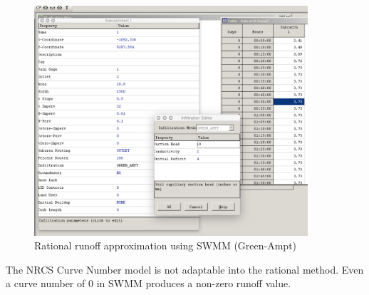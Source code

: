 \documentclass[12pt]{article}
\begin{document}
\begin{figure}[h!] %
   \centering
   \includegraphics[width=4in]{SWMMRationalGreenAmptModel.jpg} 
   \caption{Rational runoff approximation using SWMM (Green-Ampt) }
   \label{fig:SWMMRationalGreenAmptModel}
\end{figure}

The NRCS Curve Number model is not adaptable into the rational method.  Even a curve number of $0$ in SWMM produces a non-zero runoff value.
\end{document}

